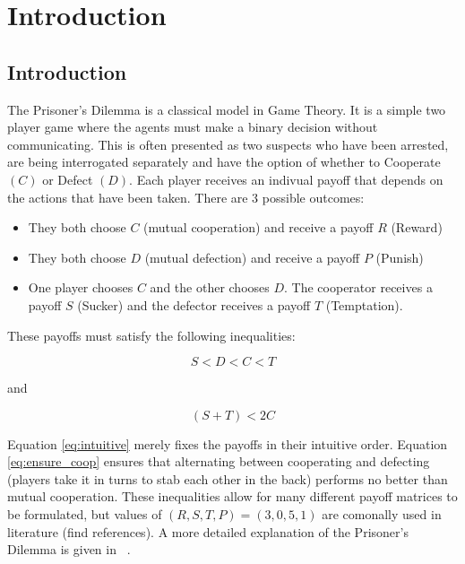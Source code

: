 \chapter{Introduction}\label{cha:introduction}

\section{Introduction}

The Prisoner's Dilemma is a classical model in Game Theory.
It is a simple two player game where the agents must make a binary decision without communicating.
This is often presented as two suspects who have been arrested, are being interrogated separately and have the option of whether to Cooperate $(C)$ or Defect $(D)$.
Each player receives an indivual payoff that depends on the actions that have been taken.
There are 3 possible outcomes:

\begin{itemize}  
\item They both choose $C$ (mutual cooperation) and receive a payoff $R$ (Reward)
\item They both choose $D$ (mutual defection) and receive a payoff $P$ (Punish)
\item One player chooses $C$ and the other chooses $D$. The cooperator receives a payoff $S$ (Sucker) and the defector receives a payoff $T$ (Temptation).
\end{itemize}

These payoffs must satisfy the following inequalities:

\begin{equation}\label{eq:intuitive}
S < D < C < T
\end{equation}

and

\begin{equation}\label{eq:ensure_coop}
(S + T) < 2 C
\end{equation}

Equation \ref{eq:intuitive} merely fixes the payoffs in their intuitive order.
Equation \ref{eq:ensure_coop} ensures that alternating between cooperating and defecting (players take it in turns to stab each other in the back) performs no better than mutual cooperation.
These inequalities allow for many different payoff matrices to be formulated, but values of $(R, S, T, P) = (3, 0, 5, 1)$ are comonally used in literature (find references).
A more detailed explanation of the Prisoner's Dilemma is given in ~\cite{Gotts2003}.

